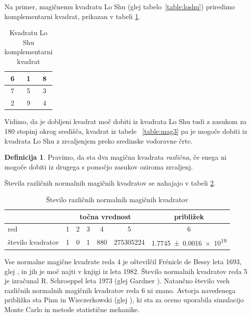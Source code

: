 \documentclass[a4paper,12pt]{article}
\newcommand{\pojem}[1]{\emph{\color{purple}#1}}
\theoremstyle{definition}
\newtheorem{definicija}{Definicija}
\theoremstyle{plain}
\newenvironment{magic}[3]
{\begin{table}[!ht]
   \centering
   \caption{#2}
   \label{#3}
   \large
   \begin{tabular}{|*{#1}{c|}}
   \hline
   }
{\end{tabular}
   \normalsize
\end{table}}
\begin{document}
Na primer, magičnemu kvadratu Lo Shu (glej tabelo~\ref{table:loshu}) priredimo
komplementarni kvadrat, prikazan v tabeli \ref{table:closhu}. %
%

\begin{magic}{3}{Kvadratu Lo Shu komplementarni kvadrat}{table:closhu}
      6 & 1 & 8 \\\hline
      7 & 5 & 3 \\\hline
      2 & 9 & 4 \\\hline
\end{magic}

Vidimo, da je dobljeni kvadrat moč dobiti iz kvadrata Lo Shu tudi z zasukom za
180 stopinj okrog središča, kvadrat iz tabele ~\ref{table:mag3} pa je mogoče dobiti
iz kvadrata Lo Shu z zrcaljenjem preko sredinske vodoravne črte. %

\begin{definicija}
   Pravimo, da sta dva magična kvadrata \pojem{različna}, če enega ni mogoče dobiti
   iz drugega s pomočjo zasukov oziroma zrcaljenj.
\end{definicija}

Števila različnih normalnih magičnih kvadratov se nahajajo v tabeli \ref{table:stevila}.

\begin{table}[!ht]
   \centering
   \caption{Število različnih normalnih magičnih kvadratov}
   \label{table:stevila}
   \begin{tabular}{lcccccc}\toprule
      & \multicolumn{5}{c}{točna vrednost} & približek \\
      \midrule
      red & 1 & 2 & 3 & 4 & 5 & 6 \\
      število kvadratov & 1 & 0 & 1 & 880 & \num{275305224} & \num[separate-uncertainty]{1.7745 \pm 0.0016 e19} \\
      \bottomrule
   \end{tabular}
\end{table}
   
   Vse normalne magične kvadrate reda 4 je oštevilčil Frénicle de Bessy
leta 1693, glej \cite{bessy}, in jih je moč najti v knjigi \cite{berlekamp}
iz leta 1982. Število normalnih kvadratov reda 5 je izračunal
R. Schroeppel leta 1973 (glej Gardner \cite{gardner}).
Natančno število vseh različnih normalnih magičnih kvadratov reda 6 ni znano.
Avtorja navedenega približka sta Pinn in Wieczerkowski (glej \cite{pinn}), ki
sta za oceno uporabila simulacijo Monte Carlo in metode statistične mehanike.
\end{document}
